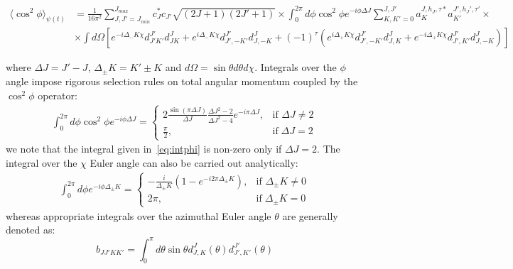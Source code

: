 \documentclass[a4paper,american,floatfix,pdftex,superscriptaddress,twoside,%
aps,pra,
linenumbers,%
reprint,%
]{revtex4-2}%
\begin{document}
\begin{widetext}
	\[
\begin{split}
\langle \cos^2 \phi \rangle_{\psi(t)}  &=  \frac{1}{16\pi^2} \sum_{J,J' =J_{min}}^{J_{max}} c_J^* c_{J'} \sqrt{(2J+1)(2J'+1)}\times 
\int_{0}^{2\pi} 
d\phi \cos^2\phi e^{-i\phi \Delta J} \sum_{K,K'=0}^{J,J'} a^{J,h_J,\tau*}_K a^{J',h_J',\tau'}_{K'}\times \\
 & \times \int d\Omega \left[
e^{-i\Delta_- K\chi}d^{J'}_{J'K'}d^{J}_{JK}+e^{i\Delta_- K\chi}d^{J'}_{J',-K'}d^{J}_{J,-K}+ 
(-1)^{\tau}(e^{i\Delta_+ K\chi}d^{J'}_{J',-K'}d^{J}_{J,K}
+e^{-i\Delta_+ K\chi}d^{J'}_{J',K'}d^{J}_{J,-K})
\right]
\end{split}
	\]
\end{widetext}
where $\Delta J = J'-J$, $\Delta_{\pm} K = K'\pm K$ and $d\Omega = \sin\theta d\theta d\chi$. Integrals over the $\phi$ angle 
impose 
rigorous selection rules on total angular momentum coupled by the $\cos ^2\phi$ operator:
\begin{equation}
\begin{split}
\int_{0}^{2\pi} 
d\phi \cos^2\phi e^{-i\phi \Delta J}  =   
\begin{cases}
2\frac{\sin(\pi \Delta J)}{\Delta J}\frac{\Delta J^2 -2}{\Delta J ^2 -4} e^{-i\pi\Delta J},& \text{if } \Delta J\neq  2\\
\frac{\pi}{2},              & \text{if} \; \Delta J = 2
\end{cases}
\end{split}
\label{eq:intphi}
\end{equation}
we note that the integral given in~\eqref{eq:intphi} is non-zero only if $\Delta J = 2$. The integral over the $\chi$ Euler angle can 
also be carried out analytically:
\begin{equation}
\begin{split}
\int_{0}^{2\pi} 
d\phi  e^{-i\phi \Delta_{\pm} K}  =   
\begin{cases}
-\frac{i}{\Delta_{\pm}K}(1-e^{-i2\pi\Delta_{\pm}K}), & \text{if }\Delta_{\pm} K\neq  0\\
2\pi,              & \text{if} \; \Delta_{\pm} K = 0
\end{cases}
\end{split}
\label{eq:intchi}
\end{equation}
whereas appropriate integrals over the azimuthal Euler angle $\theta$ are generally denoted as:
\begin{equation}
b_{JJ'KK'} = \int_0^{\pi} d\theta \sin\theta d^{J}_{J,K}(\theta) d^{J'}_{J',K'}(\theta)
\label{eq:inttheta}
\end{equation}
\end{document}
